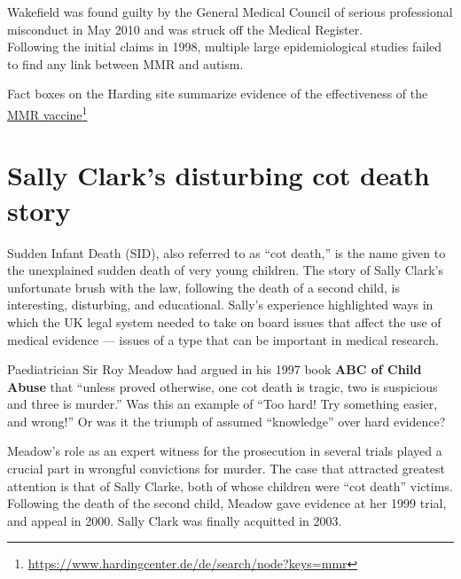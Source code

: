 \documentclass[
  10pt,
  b5paper]{book}
\begin{document}
Wakefield was found guilty by the General Medical Council of serious professional misconduct in May 2010 and was struck off the Medical Register.\\
Following the initial claims in 1998, multiple large epidemiological studies failed to find any link between MMR and autism.

Fact boxes on the Harding site summarize evidence of the
effectiveness of the \href{https://www.hardingcenter.de/de/search/node?keys=mmr}{MMR vaccine}\footnote{\url{https://www.hardingcenter.de/de/search/node?keys=mmr}}

\hypertarget{sally-clarks-disturbing-cot-death-story}{%
\section{Sally Clark's disturbing cot death story}\label{sally-clarks-disturbing-cot-death-story}}

Sudden Infant Death (SID), also referred to as ``cot death,''
is the name given to the unexplained sudden death of very
young children. The story of Sally Clark's unfortunate brush
with the law, following the death of a second child, is
interesting, disturbing, and educational. Sally's experience
highlighted ways in which the UK legal system needed to take
on board issues that affect the use of medical evidence ---
issues of a type that can be important in medical research.

Paediatrician Sir Roy Meadow had argued in his 1997 book
\textbf{ABC of Child Abuse} that ``unless proved otherwise,
one cot death is tragic, two is suspicious and three is murder.''
Was this an example of ``Too hard! Try something easier, and wrong!''
Or was it the triumph of assumed ``knowledge'' over hard evidence?

Meadow's role as an expert witness for the prosecution in several
trials played a crucial part in wrongful convictions for murder.
The case that attracted greatest attention is that of Sally Clarke,
both of whose children were ``cot death'' victims. Following the
death of the second child, Meadow gave evidence at her 1999 trial,
and appeal in 2000. Sally Clark was finally acquitted in 2003.
\end{document}
